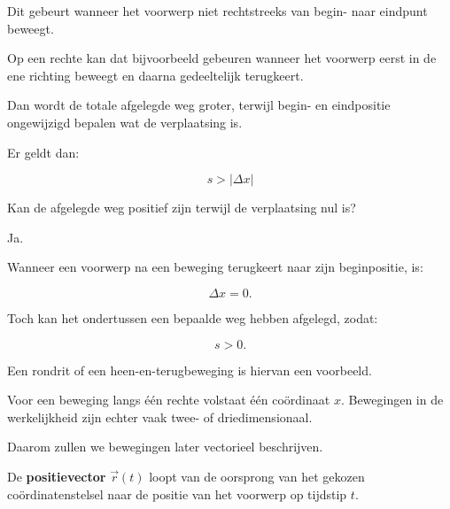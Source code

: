 \documentclass{ximera}
\begin{document}
\begin{oefening}{\oefU}
\begin{question}
  \begin{oplossing}
  Dit gebeurt wanneer het voorwerp niet rechtstreeks van begin- naar eindpunt
  beweegt.
  
  Op een rechte kan dat bijvoorbeeld gebeuren wanneer het voorwerp eerst in de
  ene richting beweegt en daarna gedeeltelijk terugkeert.
  
  Dan wordt de totale afgelegde weg groter, terwijl begin- en eindpositie
  ongewijzigd bepalen wat de verplaatsing is.
  
  Er geldt dan:
  
  \[
  \boxed{s>|\Delta x|}
  \]
  \end{oplossing}
  \end{question}
  
  
  \begin{question}
  Kan de afgelegde weg positief zijn terwijl de verplaatsing nul is?
  
  \begin{oplossing}
  Ja.
  
  Wanneer een voorwerp na een beweging terugkeert naar zijn beginpositie, is:
  
  \[
  \Delta x=0.
  \]
  
  Toch kan het ondertussen een bepaalde weg hebben afgelegd, zodat:
  
  \[
  s>0.
  \]
  
  Een rondrit of een heen-en-terugbeweging is hiervan een voorbeeld.
  \end{oplossing}
  \end{question}
  
  \end{oefening}




Voor een beweging langs één rechte volstaat één coördinaat $x$.
Bewegingen in de werkelijkheid zijn echter vaak twee- of
driedimensionaal.

Daarom zullen we bewegingen later vectorieel beschrijven.

\begin{definitie}[Positievector]

De \textbf{positievector}
\(
\vec r(t)
\)
loopt van de oorsprong van het gekozen coördinatenstelsel naar de
positie van het voorwerp op tijdstip $t$.

\end{definitie}
\end{document}
